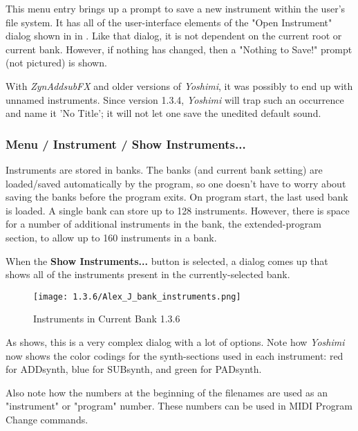    This menu entry brings up a prompt to save a new instrument within the
   user's file system.
   It has all of the user-interface elements of the "Open Instrument"
   dialog shown in
   in .
   Like that dialog, it is not dependent on the current root or current bank.
   However, if nothing has changed, then a "Nothing to Save!" prompt (not
   pictured) is shown.

   With \textsl{ZynAddsubFX} and older versions of \textsl{Yoshimi},
   it was possibly to end up with unnamed instruments. Since version
   1.3.4, \textsl{Yoshimi} will trap such an occurrence and name it
   'No Title'; it will not let one save the unedited default sound.

\subsubsection{Menu / Instrument / Show Instruments...}
\label{subsubsec:menu_instrument_show}

   Instruments are stored in banks. The banks (and current bank setting)
   are loaded/saved
   automatically by the program, so one doesn't have to worry about saving the
   banks before the program exits. On program start, the last used bank is
   loaded. A single bank can store up to 128 instruments. 
   However, there is space for a number of additional
   instruments in the bank, the extended-program section, to allow up to 160
   instruments in a bank.

   When the \textbf{Show Instruments...} button is selected, a dialog comes
   up that shows all of the instruments present in the currently-selected
   bank.
   
\begin{figure}[H]
   \centering 
   \texttt{[image: 1.3.6/Alex\_J\_bank\_instruments.png]}
   \caption[Instruments in Current Bank]{Instruments in Current Bank 1.3.6}
   \label{fig:show_alex_j_bank}
\end{figure}

   As 
   shows, this is a very complex dialog with a lot of options.
   Note how \textsl{Yoshimi} now shows the color codings for the
   synth-sections used in each instrument:
   red for ADDsynth, blue for SUBsynth, and
   green for PADsynth.

   Also note how the numbers at the beginning of the filenames are used as
   an "instrument" or "program" number.  These numbers can be used in MIDI
   Program Change commands.
   
